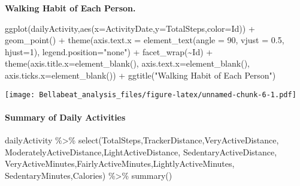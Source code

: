 \documentclass[
]{article}
\newenvironment{Shaded}{\begin{snugshade}}{\end{snugshade}}
\newcommand{\AttributeTok}[1]{\textcolor[rgb]{0.77,0.63,0.00}{#1}}
\newcommand{\DecValTok}[1]{\textcolor[rgb]{0.00,0.00,0.81}{#1}}
\newcommand{\FloatTok}[1]{\textcolor[rgb]{0.00,0.00,0.81}{#1}}
\newcommand{\FunctionTok}[1]{\textcolor[rgb]{0.00,0.00,0.00}{#1}}
\newcommand{\NormalTok}[1]{#1}
\newcommand{\SpecialCharTok}[1]{\textcolor[rgb]{0.00,0.00,0.00}{#1}}
\newcommand{\StringTok}[1]{\textcolor[rgb]{0.31,0.60,0.02}{#1}}
\begin{document}
\textbf{Walking Habit of Each Person.}

\begin{Shaded}
\begin{Highlighting}[]
\FunctionTok{ggplot}\NormalTok{(dailyActivity,}\FunctionTok{aes}\NormalTok{(}\AttributeTok{x=}\NormalTok{ActivityDate,}\AttributeTok{y=}\NormalTok{TotalSteps,}\AttributeTok{color=}\NormalTok{Id)) }\SpecialCharTok{+} \FunctionTok{geom\_point}\NormalTok{() }\SpecialCharTok{+} 
  \FunctionTok{theme}\NormalTok{(}\AttributeTok{axis.text.x =} \FunctionTok{element\_text}\NormalTok{(}\AttributeTok{angle =} \DecValTok{90}\NormalTok{, }\AttributeTok{vjust =} \FloatTok{0.5}\NormalTok{, }\AttributeTok{hjust=}\DecValTok{1}\NormalTok{),}
        \AttributeTok{legend.position=}\StringTok{"none"}\NormalTok{) }\SpecialCharTok{+} 
  \FunctionTok{facet\_wrap}\NormalTok{(}\SpecialCharTok{\textasciitilde{}}\NormalTok{Id) }\SpecialCharTok{+} \FunctionTok{theme}\NormalTok{(}\AttributeTok{axis.title.x=}\FunctionTok{element\_blank}\NormalTok{(),}
                          \AttributeTok{axis.text.x=}\FunctionTok{element\_blank}\NormalTok{(),}
                          \AttributeTok{axis.ticks.x=}\FunctionTok{element\_blank}\NormalTok{()) }\SpecialCharTok{+}
  \FunctionTok{ggtitle}\NormalTok{(}\StringTok{"Walking Habit of Each Person"}\NormalTok{)}
\end{Highlighting}
\end{Shaded}

\texttt{[image: Bellabeat\_analysis\_files/figure-latex/unnamed-chunk-6-1.pdf]}

\hypertarget{summary-of-daily-activities}{%
\paragraph{Summary of Daily
Activities}\label{summary-of-daily-activities}}

\begin{Shaded}
\begin{Highlighting}[]
\NormalTok{dailyActivity }\SpecialCharTok{\%\textgreater{}\%} 
  \FunctionTok{select}\NormalTok{(TotalSteps,TrackerDistance,VeryActiveDistance,}
\NormalTok{         ModeratelyActiveDistance,LightActiveDistance, SedentaryActiveDistance,}
\NormalTok{         VeryActiveMinutes,FairlyActiveMinutes,LightlyActiveMinutes,}
\NormalTok{         SedentaryMinutes,Calories) }\SpecialCharTok{\%\textgreater{}\%} 
  \FunctionTok{summary}\NormalTok{()}
\end{Highlighting}
\end{Shaded}
\end{document}

